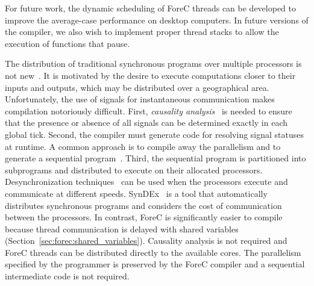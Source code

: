 For future work, the dynamic scheduling of 
ForeC threads can be developed to improve the average-case 
performance on desktop computers. 
In future versions of the compiler, we also wish to implement 
proper thread stacks to allow the execution of functions 
that pause.

The distribution of traditional synchronous programs over multiple 
processors is not new~\cite{distributed_reactive_systems_survey,distributed_synchronous_dependency_driven,distributed_reactive_systems_automatic,wcrt_esterel_multicores,YuanYR11,timed_esterel_distribution_emperor,timed_multiclock_multithreaded}.
It is motivated by the desire to execute computations closer
to their inputs and outputs, which may be distributed over a
geographical area. Unfortunately, the use of signals for
instantaneous communication makes compilation notoriously
difficult. First, \emph{causality analysis}~\cite{timed_compiling_esterel} 
is needed to ensure that the presence or absence of all signals
can be determined exactly in each global tick. Second, the compiler 
must generate code for resolving signal statuses at runtime.
A common approach is to compile away the parallelism and to generate
a sequential program~\cite{timed_cec,timed_compiling_esterel}.
Third, the sequential program is partitioned into subprograms 
and distributed to execute on their allocated processors. 
Desynchronization techniques~\cite{BenvenisteCG00,GiraultNP06,distributed_synchronous_desynchronize_modes} 
can be used when the processors execute and communicate at different speeds. 
SynDEx~\cite{distributed_synchronous_semantics_preserving} is 
a tool that automatically distributes synchronous programs and 
considers the cost of communication between the processors.
In contrast, ForeC is significantly easier to compile because thread
communication is delayed with shared variables 
(Section~\ref{sec:forec:shared_variables}). Causality analysis
is not required and ForeC threads can be distributed directly
to the available cores. The parallelism specified by
the programmer is preserved by the ForeC compiler and a
sequential intermediate code is not required.

